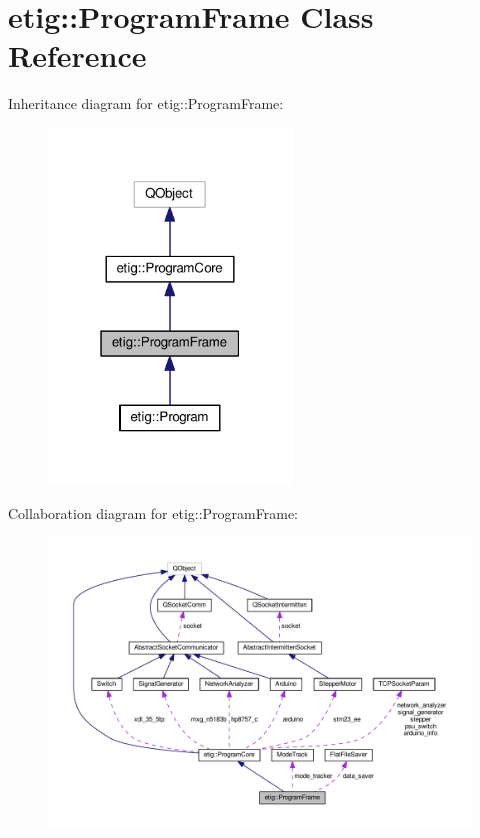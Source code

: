 \hypertarget{classetig_1_1_program_frame}{}\section{etig\+:\+:Program\+Frame Class Reference}
\label{classetig_1_1_program_frame}


Inheritance diagram for etig\+:\+:Program\+Frame\+:\nopagebreak
\begin{figure}[H]
\begin{center}
\leavevmode
\includegraphics[width=183pt]{classetig_1_1_program_frame__inherit__graph}
\end{center}
\end{figure}


Collaboration diagram for etig\+:\+:Program\+Frame\+:\nopagebreak
\begin{figure}[H]
\begin{center}
\leavevmode
\includegraphics[width=350pt]{classetig_1_1_program_frame__coll__graph}
\end{center}
\end{figure}
